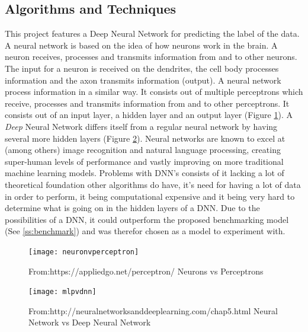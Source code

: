 \documentclass[preprint,12pt]{elsarticle}
\begin{document}


\subsection{Algorithms and Techniques}
This project features a Deep Neural Network for predicting the label of the data. A neural network is based on the idea of how neurons work in the brain. A neuron receives, processes and transmits information from and to other neurons. The input for a neuron is received on the dendrites, the cell body processes information and the axon transmits information (output). A neural network process information in a similar way. It consists out of multiple perceptrons which receive, processes and transmits information from and to other perceptrons. It consists out of an input layer, a hidden layer and an output layer (Figure \ref{fig:neuronvperceptron}). A \textit{Deep} Neural Network differs itself from a regular neural network by having several more hidden layers (Figure \ref{fig:mlpvdnn}). Neural networks are known to excel at (among others) image recognition and natural language processing, creating super-human levels of performance and vastly improving on more traditional machine learning models. Problems with DNN's consists of it lacking a lot of theoretical foundation other algorithms do have, it's need for having a lot of data in order to perform, it being computational expensive and it being very hard to determine what is going on in the hidden layers of a DNN. Due to the possibilities of a DNN, it could outperform the proposed benchmarking model (See \ref{ss:benchmark}) and was therefor chosen as a model to experiment with.

\begin{figure}[h!]
\centering\texttt{[image: neuronvperceptron]}
\caption{From:https://appliedgo.net/perceptron/ Neurons vs Perceptrons}
\label{fig:neuronvperceptron}
\end{figure}

\begin{figure}[h!]
\centering\texttt{[image: mlpvdnn]}
\caption{From:http://neuralnetworksanddeeplearning.com/chap5.html Neural Network vs Deep Neural Network}
\label{fig:mlpvdnn}
\end{figure}
\end{document}
